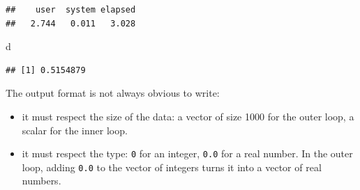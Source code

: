 \documentclass[
  12pt,
  american,
  a4paper,
  extrafontsizes,onecolumn,openright
  ]{memoir}
\newenvironment{Shaded}{\begin{snugshade}}{\end{snugshade}}
\newcommand{\ControlFlowTok}[1]{\textcolor[rgb]{0.13,0.29,0.53}{\textbf{#1}}}
\newcommand{\DecValTok}[1]{\textcolor[rgb]{0.00,0.00,0.81}{#1}}
\newcommand{\FunctionTok}[1]{\textcolor[rgb]{0.13,0.29,0.53}{\textbf{#1}}}
\newcommand{\NormalTok}[1]{#1}
\newcommand{\OtherTok}[1]{\textcolor[rgb]{0.56,0.35,0.01}{#1}}
\newcommand{\SpecialCharTok}[1]{\textcolor[rgb]{0.81,0.36,0.00}{\textbf{#1}}}
\providecommand{\tightlist}{%
  \setlength{\itemsep}{0pt}\setlength{\parskip}{0pt}}
\begin{document}
\begin{Shaded}
\end{Shaded}

\begin{verbatim}
##    user  system elapsed 
##   2.744   0.011   3.028
\end{verbatim}

\begin{Shaded}
\begin{Highlighting}[]
\NormalTok{d}
\end{Highlighting}
\end{Shaded}

\begin{verbatim}
## [1] 0.5154879
\end{verbatim}

\normalsize

The output format is not always obvious to write:

\begin{itemize}
\tightlist
\item
  it must respect the size of the data: a vector of size 1000 for the outer loop, a scalar for the inner loop.
\item
  it must respect the type: \texttt{0} for an integer, \texttt{0.0} for a real number. In the outer loop, adding \texttt{0.0} to the vector of integers turns it into a vector of real numbers.
\end{itemize}
\end{document}
